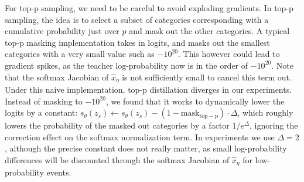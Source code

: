 For top-p sampling, we need to be careful to avoid exploding gradients.
In top-p sampling, the idea is to select a subset of categories corresponding with a cumulative probability just over $p$ and mask out the other categories.
A typical top-p masking implementation takes in logits, and masks out the smallest categories with a very small value such as $-10^{20}$.
This however could lead to gradient spikes, as the teacher log-probability now is in the order of $-10^{20}$. Note that the softmax Jacobian of $\hat{x}_\eta$ is not sufficiently small to cancel this term out. Under this naive implementation, top-p distillation diverges in our experiments.
%
Instead of masking to $-10^{20}$, we found that it works to dynamically lower the logits by a constant: $s_\theta(z_s) \leftarrow s_\theta(z_s) - (1-\mathrm{mask}_{\mathrm{top-p}}) \cdot \Delta$, which roughly lowers the probability of the masked out categories by a factor $1/e^\Delta$, ignoring the correction effect on the softmax normalization term. In experiments we use $\Delta=2$, although the precise constant does not really matter,  as small log-probability differences will be discounted through the softmax Jacobian of $\hat{x}_\eta$ for low-probability events.




